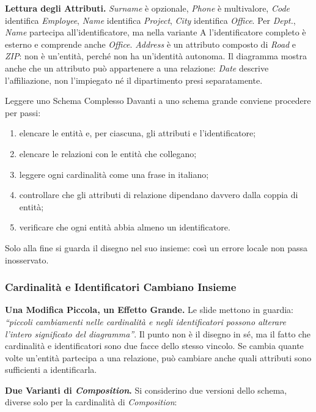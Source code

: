 \documentclass[12pt]{extarticle}
\begin{document}
\medskip
\noindent \textbf{Lettura degli Attributi.} \textit{Surname} è opzionale, \textit{Phone} è multivalore, \textit{Code} identifica \textit{Employee}, \textit{Name} identifica \textit{Project}, \textit{City} identifica \textit{Office}. Per \textit{Dept.}, \textit{Name} partecipa all'identificatore, ma nella variante A l'identificatore completo è esterno e comprende anche \textit{Office}. \textit{Address} è un attributo composto di \textit{Road} e \textit{ZIP}: non è un'entità, perché non ha un'identità autonoma. Il diagramma mostra anche che un attributo può appartenere a una relazione: \textit{Date} descrive l'affiliazione, non l'impiegato né il dipartimento presi separatamente.

\begin{cbox}{Leggere uno Schema Complesso}
\noindent Davanti a uno schema grande conviene procedere per passi:
\begin{enumerate}
    \item elencare le entità e, per ciascuna, gli attributi e l'identificatore;
    \item elencare le relazioni con le entità che collegano;
    \item leggere ogni cardinalità come una frase in italiano;
    \item controllare che gli attributi di relazione dipendano davvero dalla coppia di entità;
    \item verificare che ogni entità abbia almeno un identificatore.
\end{enumerate}
Solo alla fine si guarda il disegno nel suo insieme: così un errore locale non passa inosservato.
\end{cbox}

\subsubsection{Cardinalità e Identificatori Cambiano Insieme}

\noindent \textbf{Una Modifica Piccola, un Effetto Grande.} Le slide mettono in guardia: \textit{``piccoli cambiamenti nelle cardinalità e negli identificatori possono alterare l'intero significato del diagramma''}. Il punto non è il disegno in sé, ma il fatto che cardinalità e identificatori sono due facce dello stesso vincolo. Se cambia quante volte un'entità partecipa a una relazione, può cambiare anche quali attributi sono sufficienti a identificarla.

\medskip
\noindent \textbf{Due Varianti di \textit{Composition}.} Si considerino due versioni dello schema, diverse solo per la cardinalità di \textit{Composition}:
\end{document}
